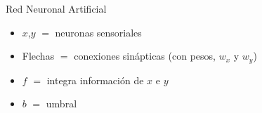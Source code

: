 \begin{myframe}
\centering



\begin{block}{\centering Red Neuronal Artificial}
\centering
\begin{itemize}
\centering
\item $x$,$y$ $=$ neuronas sensoriales
\item Flechas $=$ conexiones sinápticas (con pesos, $w_x$ y $w_y$)
\item $f$ $=$ integra información de $x$ e $y$
\item $b$ $=$ umbral
\end{itemize}
\end{block}
\end{myframe}



